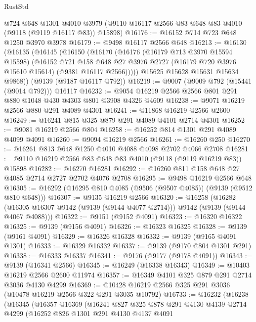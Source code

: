 \begin{lexlean}{RustStd}
\begin{coremodule}
    @724
    @648
    @1301
    @4010
    @3979
    (@9110 @16117 @2566 @83 @648 @83 @4010 (@9118 (@9119 @16117 @83)) @15898)
@16176 := @16152 @714 @723 @648 @1250 @3970 @3978
@16179 := @9498 @16117 @2566 @648
@16213 := @16130
    (@16135
      (@16145
        (@16150
          (@16170
            (@16176
              (@16179 @713 @3970 @15594 @15598)
              (@16152
                @721
                @158
                @648
                @27
                @3976
                @2727
                (@16179 @720 @3976 @15610 @15614)
                (@9381 @16117 @2566)))))
        @15625
        @15628
        @15631
        @15634
        @9868))
    (@9139 (@9187 @16117 @792))
@16219 := @9007 (@9009 @792 (@15441 (@9014 @792))) @16117
@16232 := @9054 @16219 @2566 @2566 @801 @291 @880 @1048 @430 @4303 @801 @3908 @4326 @4609
@16238 := @9071 @16219 @2566 @880 @291 @4089 @4301
@16241 := @11868 @16219 @2566 @2600
@16249 := @16241 @815 @325 @879 @291 @4089 @4101 @2714 @4301
@16252 := @9081 @16219 @2566 @804
@16258 := @16252 @814 @1301 @291 @4089 @4099 @4091
@16260 := @9094 @16219 @2566
@16261 := @16260 @250
@16270 := @16261 @813 @648 @1250 @4010 @4088 @4098 @2702 @4066 @2708
@16281 := @9110 @16219 @2566 @83 @648 @83 @4010 (@9118 (@9119 @16219 @83)) @15898
@16282 := @16270 @16281
@16292 := @16260 @811 @158 @648 @27 @4085 @2714 @2727 @2702 @4076 @2708
@16295 := @9498 @16219 @2566 @648
@16305 := @16292 (@16295 @810 @4085 (@9506 (@9507 @4085)) (@9139 (@9512 @810 @648)))
@16307 := @9135 @16219 @2566
@16320 := @16258
    (@16282 (@16305 @16307 @9142 (@9139 (@9144 @4077 @2714))) @9142 (@9139 (@9144 @4067 @4088)))
@16322 := @9151 (@9152 @4091)
@16323 := @16320 @16322
@16325 := @9139 (@9156 @4091)
@16326 := @16323 @16325
@16328 := @9139 (@9161 @4091)
@16329 := @16326 @16328
@16332 := @9139 (@9165 @4091 @1301)
@16333 := @16329 @16332
@16337 := @9139 (@9170 @804 @1301 @291)
@16338 := @16333 @16337
@16341 := @9176 (@9177 (@9178 @4091))
@16343 := @9139 (@16341 @2566)
@16345 := @16249 (@16338 @16343)
@16349 := @10403 @16219 @2566 @2600 @11974
@16357 := @16349 @4101 @325 @879 @291 @2714 @3036 @4130 @4299
@16369 := @10428 @16219 @2566 @325 @291 @3036 (@10478 @16219 @2566 @322 @291 @3035 @10792)
@16733 := @16232
    (@16238
      (@16345
        (@16357
          @16369
          (@16241
            @827
            @325
            @878
            @291
            @4130
            @4139
            @2714
            @4299
            (@16252
              @826
              @1301
              @291
              @4130
              @4137
              @4091

\end{coremodule}
\end{lexlean}
